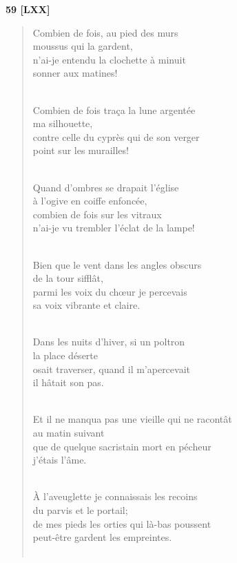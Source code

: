 \documentclass[a4paper,11pt]{book}
\begin{document}
\bigskip

\begin{center} {\bf 59 [LXX]} \end{center}

\begin{verse}
Combien de fois, au pied des murs \\
moussus qui la gardent, \\
n'ai-je entendu la clochette à minuit \\
sonner aux matines! \\ \

Combien de fois tra\c{c}a la lune argentée \\
ma silhouette, \\
contre celle du cyprès qui de son verger \\
point sur les murailles! \\ \

Quand d'ombres se drapait l'église \\
à l'ogive en coiffe enfoncée, \\
combien de fois sur les vitraux \\
n'ai-je vu trembler l'éclat de la lampe! \\ \

Bien que le vent dans les angles obscurs \\
de la tour sifflât, \\
parmi les voix du ch{\oe}ur je percevais \\
sa voix vibrante et claire. \\ \

Dans les nuits d'hiver, si un poltron \\
la place déserte \\
osait traverser, quand il m'apercevait \\
il hâtait son pas. \\ \

Et il ne manqua pas une vieille qui ne racontât \\
au matin suivant \\
que de quelque sacristain mort en pécheur \\
j'étais l'âme. \\ \

À l'aveuglette je connaissais les recoins \\
du parvis et le portail; \\
de mes pieds les orties qui là-bas poussent \\
peut-être gardent les empreintes. \\ \


\end{verse}
\end{document}
